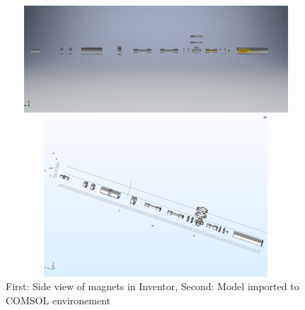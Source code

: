 \documentclass[12pt,a4paper]{article}
\begin{document}
\begin{figure}[h]
\centering

\includegraphics[width=120mm,
height=40mm]{full-beam-line-half}

\includegraphics[width=120mm, height=60mm]{full-comsol}
\caption{First: Side view of magnets in Inventor, Second: Model imported to COMSOL environement }
\end{figure}
\end{document}
